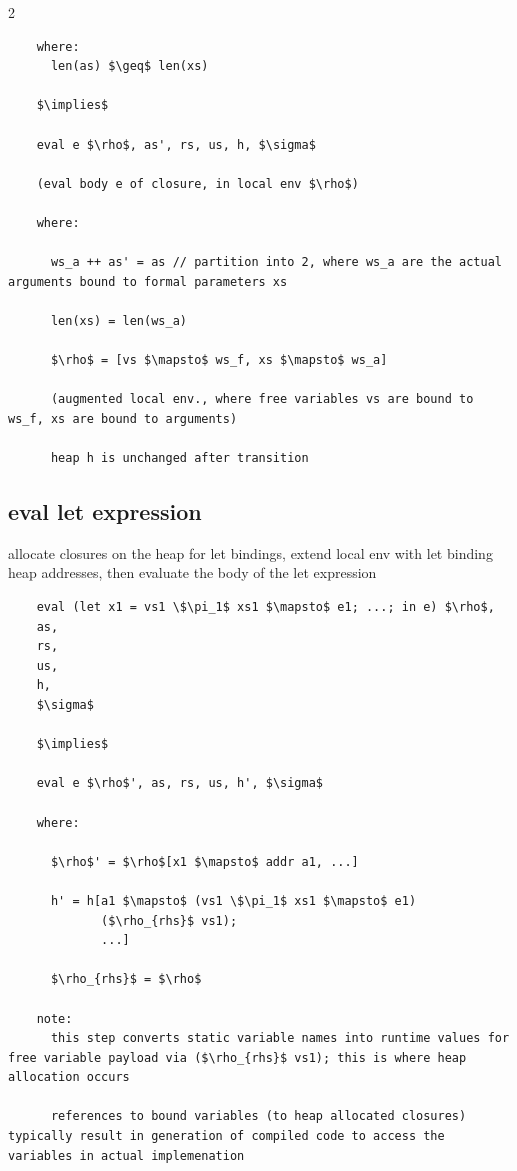 \documentclass[8pt]{extarticle}
\begin{document}
\begin{multicols*}{2}
\begin{lstlisting}
    where:
      len(as) $\geq$ len(xs)

    $\implies$

    eval e $\rho$, as', rs, us, h, $\sigma$

    (eval body e of closure, in local env $\rho$)

    where:

      ws_a ++ as' = as // partition into 2, where ws_a are the actual arguments bound to formal parameters xs

      len(xs) = len(ws_a)

      $\rho$ = [vs $\mapsto$ ws_f, xs $\mapsto$ ws_a]

      (augmented local env., where free variables vs are bound to ws_f, xs are bound to arguments)

      heap h is unchanged after transition
  \end{lstlisting}

  \vfill\null
  \columnbreak

  \subsection{eval let expression}

  allocate closures on the heap for let bindings, extend local env with let binding heap addresses, then evaluate the body of the let expression
  
  \begin{lstlisting}
    eval (let x1 = vs1 \$\pi_1$ xs1 $\mapsto$ e1; ...; in e) $\rho$,
    as,
    rs,
    us,
    h,
    $\sigma$

    $\implies$

    eval e $\rho$', as, rs, us, h', $\sigma$

    where:

      $\rho$' = $\rho$[x1 $\mapsto$ addr a1, ...]
      
      h' = h[a1 $\mapsto$ (vs1 \$\pi_1$ xs1 $\mapsto$ e1)
             ($\rho_{rhs}$ vs1);
             ...]

      $\rho_{rhs}$ = $\rho$

    note:
      this step converts static variable names into runtime values for free variable payload via ($\rho_{rhs}$ vs1); this is where heap allocation occurs

      references to bound variables (to heap allocated closures) typically result in generation of compiled code to access the variables in actual implemenation
  \end{lstlisting}


\end{multicols*}
\end{document}
